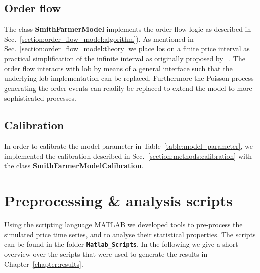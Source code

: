 \documentclass[11pt, a4paper]{thesis}  %
\begin{document}
\subsection{Order flow} 

The class {\bf SmithFarmerModel} implements the order flow logic as described in Sec.~\ref{section:order_flow_model:algorithm}). As mentioned in Sec.~\ref{section:order_flow_model:theory} we place \acp{lo} on a finite price interval as practical simplification of the infinite interval as originally proposed by \citeauthor{Smith:2003:StatisticalModel}~\cite{Smith:2003:StatisticalModel}. The order flow interacts with \ac{lob} by means of a general interface such that the underlying \ac{lob} implementation can be replaced. Furthermore the Poisson process generating the order events can readily be replaced to extend the model to more sophisticated processes. 

\subsection{Calibration} 

In order to calibrate the model parameter in Table~\ref{table:model_parameter}, we implemented the calibration described in Sec.~\ref{section:methods:calibration} with the class {\bf SmithFarmerModelCalibration}. 



\section{Preprocessing \& analysis scripts} 
\label{section:implementation:scripts}

Using the scripting language MATLAB we developed tools to pre-process the simulated price time series, and to analyse their statistical properties. The scripts can be found in the folder {\bf \texttt{Matlab\_Scripts}}. In the following we give a short overview over the scripts that were used to generate the results in Chapter~\ref{chapter:results}.
\end{document}
